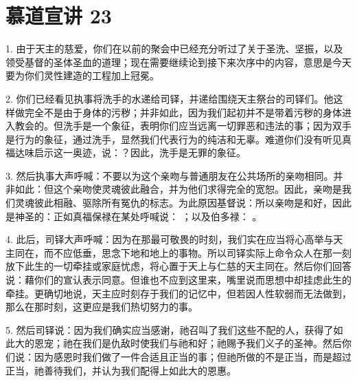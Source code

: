 \section{慕道宣讲 23}

\par

\par

\par

\par

1. 由于天主的慈爱，你们在以前的聚会中已经充分听过了关于圣洗、坚振，以及领受基督的圣体圣血的道理；现在需要继续论到接下来次序中的内容，意思是今天要为你们灵性建造的工程加上冠冕。\par

2. 你们已经看见执事将洗手的水递给司铎，并递给围绕天主祭台的司铎们。他这样做完全不是由于身体的污秽；并非如此，因为我们起初并不是带着污秽的身体进入教会的。但洗手是一个象征，表明你们应当远离一切罪恶和违法的事；因为双手是行为的象征，通过洗手，显然我们代表行为的纯洁和无辜。难道你们没有听见真福达味启示这一奥迹，说：？因此，洗手是无罪的象征。\par

3. 然后执事大声呼喊：不要以为这个亲吻与普通朋友在公共场所的亲吻相同。并非如此：但这个亲吻使灵魂彼此融合，并为他们求得完全的宽恕。因此，亲吻是我们灵魂彼此相融、驱除所有冤仇的标志。为此原因基督说：所以亲吻是和好，因此是神圣的：正如真福保禄在某处呼喊说： ；以及伯多禄： 。\par

4. 此后，司铎大声呼喊：因为在那最可敬畏的时刻，我们实在应当将心高举与天主同在，而不应低垂，思念下地和地上的事物。所以司铎实际上命令众人在那一刻放下此生的一切牵挂或家庭忧虑，将心置于天上与仁慈的天主同在。然后你们回答说：藉你们的宣认表示同意。但谁也不应到这里来，嘴里说而思想中却挂虑此生的牵挂。更确切地说，天主应时刻存于我们的记忆中，但若因人性软弱而无法做到，那么在那时刻，这更应是我们热切努力的事。\par

5. 然后司铎说：因为我们确实应当感谢，祂召叫了我们这些不配的人，获得了如此大的恩宠；祂在我们是仇敌时使我们与祂和好；祂赐予我们义子的圣神。然后你们说：因为感恩时我们做了一件合适且正当的事；但祂所做的不是正当，而是超过正当，祂善待我们，并认为我们配得上如此大的恩惠。\par


